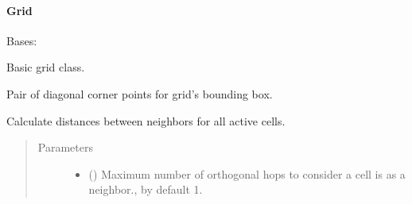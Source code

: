 \documentclass[letterpaper,10pt,english]{sphinxmanual}
\begin{document}
\paragraph{Grid}
\label{\detokenize{api/grids:grid}}

\begin{fulllineitems}
\label{\detokenize{api/grids:geology.src.Grid}}
Bases: {\hyperref[\detokenize{api/base_classes:geology.src.base_spatial.SpatialComponent}]{}}

Basic grid class.

\begin{fulllineitems}
\label{\detokenize{api/grids:geology.src.Grid.bounding_box}}
Pair of diagonal corner points for grid’s bounding box.

\end{fulllineitems}


\begin{fulllineitems}
\label{\detokenize{api/grids:geology.src.Grid.calculate_neighbours_distances}}
Calculate distances between neighbors for all active cells.
\begin{quote}\begin{description}
\item[{Parameters}] \leavevmode\begin{itemize}
\item {} 
 (\sphinxstyleliteralemphasis{\sphinxupquote{, }}) \textendash{} Maximum number of orthogonal hops to consider a cell is
as a neighbor., by default 1.


\end{itemize}
\end{description}
\end{quote}
\end{fulllineitems}
\end{fulllineitems}
\end{document}
